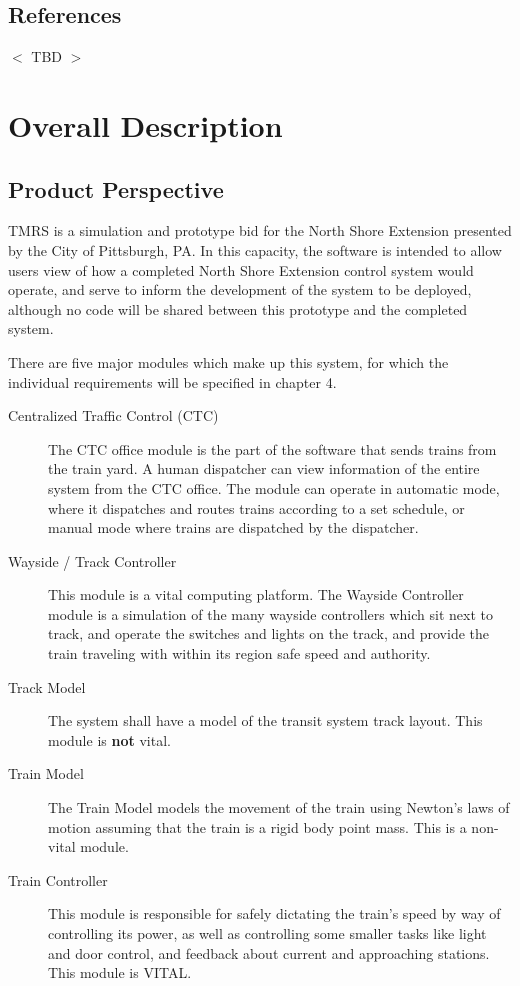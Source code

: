 \documentclass{scrreprt}
\begin{document}
\section{References}
$<$ TBD $>$

\chapter{Overall Description}

\section{Product Perspective}
TMRS is a simulation and prototype bid for the North Shore Extension presented by the City of Pittsburgh, PA.
In this capacity, the software is intended to allow users view of how a completed North Shore Extension control system would operate, and serve to inform the development of the system to be deployed, although no code will be shared between this prototype and the completed system.

There are five major modules which make up this system, for which the individual requirements will be specified in chapter 4.

\begin{description}
    \item[Centralized Traffic Control (CTC)] The CTC office module is the part of the software that sends trains from the train yard.
    A human dispatcher can view information of the entire system from the CTC office.
    The module can operate in automatic mode, where it dispatches and routes trains according to a set schedule, or manual mode where trains are dispatched by the dispatcher.
    \item[Wayside / Track Controller] This module is a vital computing platform.
    The Wayside Controller module is a simulation of the many wayside controllers which sit next to track, and operate the switches and lights on the track, and provide the train traveling with within its region safe speed and authority.
    \item[Track Model] The system shall have a model of the transit system track layout. This module is \textbf{not} vital.
    \item[Train Model] The Train Model models the movement of the train using Newton's laws of motion
    assuming that the train is a rigid body point mass. This is a non-vital module.
    \item[Train Controller] This module is responsible for safely dictating the train's speed by way of controlling its power, as well as controlling some smaller tasks like light and door control, and feedback about current and approaching stations. This module is VITAL.
\end{description}
\end{document}
